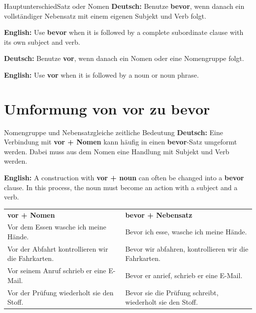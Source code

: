 \documentclass[a4paper,11pt]{article}
\newcommand{\GermanText}[1]{\textbf{Deutsch: }#1\par}
\newcommand{\EnglishText}[1]{{\small\color{SoftGray}\textbf{English: }#1\par}}
\begin{document}
        \begin{grammarentry}{Hauptunterschied}{Satz oder Nomen}
            \GermanText{Benutze \textbf{bevor}, wenn danach ein vollständiger Nebensatz mit einem eigenen Subjekt und Verb folgt.}
            \EnglishText{Use \textbf{bevor} when it is followed by a complete subordinate clause with its own subject and verb.}

            \GermanText{Benutze \textbf{vor}, wenn danach ein Nomen oder eine Nomengruppe folgt.}
            \EnglishText{Use \textbf{vor} when it is followed by a noun or noun phrase.}
        \end{grammarentry}

    \section{Umformung von \glqq vor\grqq{} zu \glqq bevor\grqq}

        \begin{grammarentry}{Nomengruppe und Nebensatz}{gleiche zeitliche Bedeutung}
            \GermanText{Eine Verbindung mit \textbf{vor + Nomen} kann häufig in einen \textbf{bevor}-Satz umgeformt werden. Dabei muss aus dem Nomen eine Handlung mit Subjekt und Verb werden.}
            \EnglishText{A construction with \textbf{vor + noun} can often be changed into a \textbf{bevor} clause. In this process, the noun must become an action with a subject and a verb.}
        \end{grammarentry}

        \begin{longtable}{p{6.5cm}|p{7cm}}
            \rowcolor{HeaderBlueDark}
            \color{white}\textbf{vor + Nomen} &
            \color{white}\textbf{bevor + Nebensatz} \\
            Vor dem Essen wasche ich meine Hände. & Bevor ich esse, wasche ich meine Hände. \\
            Vor der Abfahrt kontrollieren wir die Fahrkarten. & Bevor wir abfahren, kontrollieren wir die Fahrkarten. \\
            Vor seinem Anruf schrieb er eine E-Mail. & Bevor er anrief, schrieb er eine E-Mail. \\
            Vor der Prüfung wiederholt sie den Stoff. & Bevor sie die Prüfung schreibt, wiederholt sie den Stoff. \\
        \end{longtable}

    \newpage
\end{document}

